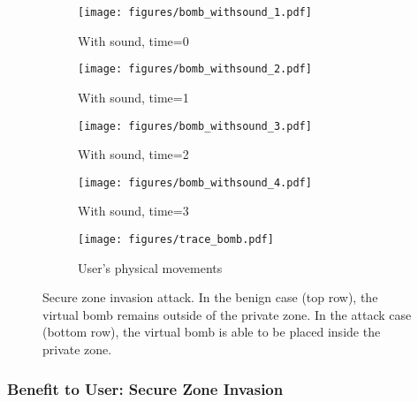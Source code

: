 \begin{figure*}[h]
\begin{minipage}{0.8\textwidth}
        \begin{subfigure}{0.24\textwidth}
            \texttt{[image: figures/bomb\_withsound\_1.pdf]}
            \caption{With sound, time=0}
            \label{subfig:bomb_withsound_frame1}
        \end{subfigure}
        \hfill
        \begin{subfigure}{0.24\textwidth}
            \texttt{[image: figures/bomb\_withsound\_2.pdf]}
            \caption{With sound, time=1}
            \label{subfig:bomb_withsound_frame2}
        \end{subfigure}
        \hfill
        \begin{subfigure}{0.24\textwidth}
            \texttt{[image: figures/bomb\_withsound\_3.pdf]}
            \caption{With sound, time=2}
            \label{subfig:bomb_withsound_frame3}
        \end{subfigure}
        \hfill
        \begin{subfigure}{0.24\textwidth}
            \texttt{[image: figures/bomb\_withsound\_4.pdf]}
            \caption{With sound, time=3}
            \label{subfig:bomb_withsound_frame4}
        \end{subfigure}
    \end{minipage}
    \hfill
    \begin{minipage}{0.19\textwidth}
        \centering
        \begin{subfigure}{\textwidth}
            \texttt{[image: figures/trace\_bomb.pdf]}
            \caption{User's physical movements}
            \label{subfig:bomb_usertrace}
        \end{subfigure}
    \end{minipage}
    \caption{Secure zone invasion attack. 
    In the benign case (top row), the virtual bomb remains outside of the private zone.
    In the attack case (bottom row), the virtual bomb is able to be placed inside the private zone.
    }
    \label{fig:bomb}
\end{figure*}


\subsubsection{Benefit to User: Secure Zone Invasion}
\label{sec:app_secure_zone}


